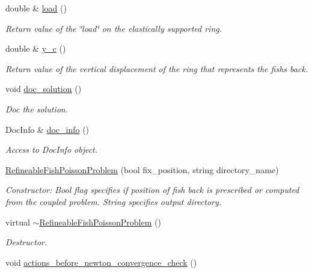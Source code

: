 \begin{DoxyCompactItemize}
\item 
double \& \hyperlink{classRefineableFishPoissonProblem_a20702e8945d442c9597348b550da14e4}{load} ()
\begin{DoxyCompactList}\small\item\em Return value of the \char`\"{}load\char`\"{} on the elastically supported ring. \end{DoxyCompactList}\item 
double \& \hyperlink{classRefineableFishPoissonProblem_a152227cc825ddea07cb06c2791f5995b}{y\+\_\+c} ()
\begin{DoxyCompactList}\small\item\em Return value of the vertical displacement of the ring that represents the fish\textquotesingle{}s back. \end{DoxyCompactList}\item 
void \hyperlink{classRefineableFishPoissonProblem_a6db25ff0bd3014aa531d9f0e8b385beb}{doc\+\_\+solution} ()
\begin{DoxyCompactList}\small\item\em Doc the solution. \end{DoxyCompactList}\item 
Doc\+Info \& \hyperlink{classRefineableFishPoissonProblem_a093f5963e63746843c33ca444a205333}{doc\+\_\+info} ()
\begin{DoxyCompactList}\small\item\em Access to Doc\+Info object. \end{DoxyCompactList}\item 
\hyperlink{classRefineableFishPoissonProblem_a0211667b09b7da71184de2524609701f}{Refineable\+Fish\+Poisson\+Problem} (bool fix\+\_\+position, string directory\+\_\+name)
\begin{DoxyCompactList}\small\item\em Constructor\+: Bool flag specifies if position of fish back is prescribed or computed from the coupled problem. String specifies output directory. \end{DoxyCompactList}\item 
virtual \hyperlink{classRefineableFishPoissonProblem_a4a5e7c5f264364211ad641353933c222}{$\sim$\+Refineable\+Fish\+Poisson\+Problem} ()
\begin{DoxyCompactList}\small\item\em Destructor. \end{DoxyCompactList}\item 
void \hyperlink{classRefineableFishPoissonProblem_a8d8fb7ef1c571c57c02073edab4a7759}{actions\+\_\+before\+\_\+newton\+\_\+convergence\+\_\+check} ()

\end{DoxyCompactItemize}
